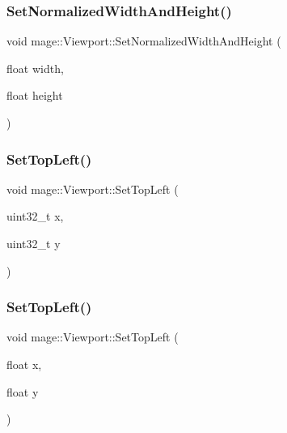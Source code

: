 \hypertarget{structmage_1_1_viewport_a31417611b70576d097381ceea7939762}{}\label{structmage_1_1_viewport_a31417611b70576d097381ceea7939762} 
\subsubsection{\texorpdfstring{Set\+Normalized\+Width\+And\+Height()}{SetNormalizedWidthAndHeight()}}
{\footnotesize\ttfamily void mage\+::\+Viewport\+::\+Set\+Normalized\+Width\+And\+Height (\begin{DoxyParamCaption}\item[{float}]{width,  }\item[{float}]{height }\end{DoxyParamCaption})\hspace{0.3cm}{\ttfamily [noexcept]}}

\hypertarget{structmage_1_1_viewport_af885922e6c71d5c9add4412e097a1bd0}{}\label{structmage_1_1_viewport_af885922e6c71d5c9add4412e097a1bd0} 
\subsubsection{\texorpdfstring{Set\+Top\+Left()}{SetTopLeft()}\hspace{0.1cm}{\footnotesize\ttfamily [1/2]}}
{\footnotesize\ttfamily void mage\+::\+Viewport\+::\+Set\+Top\+Left (\begin{DoxyParamCaption}\item[{uint32\+\_\+t}]{x,  }\item[{uint32\+\_\+t}]{y }\end{DoxyParamCaption})\hspace{0.3cm}{\ttfamily [noexcept]}}

\hypertarget{structmage_1_1_viewport_acb3a7422f4e70a225e89c3fd8c0ab79c}{}\label{structmage_1_1_viewport_acb3a7422f4e70a225e89c3fd8c0ab79c} 
\subsubsection{\texorpdfstring{Set\+Top\+Left()}{SetTopLeft()}\hspace{0.1cm}{\footnotesize\ttfamily [2/2]}}
{\footnotesize\ttfamily void mage\+::\+Viewport\+::\+Set\+Top\+Left (\begin{DoxyParamCaption}\item[{float}]{x,  }\item[{float}]{y }\end{DoxyParamCaption})\hspace{0.3cm}{\ttfamily [noexcept]}}

